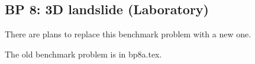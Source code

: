 \newsection

\subsection{BP 8:
 3D landslide (Laboratory)}

There are plans to replace this benchmark problem with a new one.

The old benchmark problem is in bp8a.tex.
